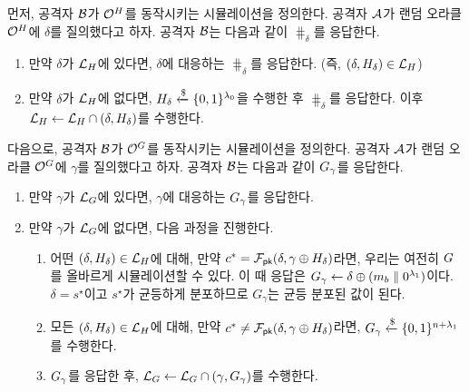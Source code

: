 \documentclass{article}
\theoremstyle{definition}
\newtheorem{memo}{메모}[section]
\begin{document}

먼저, 공격자 $\mathcal{B}$가 $\mathcal{O}^{H}$를 동작시키는 시뮬레이션을 정의한다. 공격자
$\mathcal{A}$가 랜덤 오라클 $\mathcal{O}^{H}$에 $\delta$를 질의했다고 하자. 공격자
$\mathcal{B}$는 다음과 같이 $\hash_{\delta}$를 응답한다.
\begin{enumerate}
	\item 만약 $\delta$가 $\mathcal{L}_{H}$에 있다면, $\delta$에 대응하는
	$\hash_\delta$를 응답한다. (즉, $(\delta, H_{\delta}) \in \mathcal{L}_{H}$)
	\item 만약 $\delta$가 $\mathcal{L}_{H}$에 없다면, $H_{\delta} \xleftarrow{\$}
	\{0 ,1\}^{\lambda_0}$을 수행한 후 $\hash_{\delta}$를 응답한다. 이후
	$\mathcal{L}_{H} \gets \mathcal{L}_{H} \cap (\delta, H_{\delta})$를
	수행한다.
\end{enumerate}

다음으로, 공격자 $\mathcal{B}$가 $\mathcal{O}^{G}$를 동작시키는 시뮬레이션을 정의한다.
공격자 $\mathcal{A}$가 랜덤 오라클 $\mathcal{O}^{G}$에 $\gamma$를 질의했다고 하자. 공격자
$\mathcal{B}$는 다음과 같이 $G_{\gamma}$를 응답한다.
\begin{enumerate}
	\item 만약 $\gamma$가 $\mathcal{L}_{G}$에 있다면, $\gamma$에 대응하는
	$G_{\gamma}$를 응답한다.
	\item 만약 $\gamma$가 $\mathcal{L}_{G}$에 없다면, 다음 과정을 진행한다.
	\begin{enumerate}
		\item 어떤 $(\delta, H_{\delta}) \in \mathcal{L}_{H}$에 대해, 만약
		$c^* = \mathcal{F}_{\textsf{pk}}(\delta, \gamma \oplus H_{\delta})$라면, 우리는 여전히
		$G$를 올바르게 시뮬레이션할 수 있다. 이 때 응답은 $G_{\gamma}
		\gets \delta \oplus (m_{b} \parallel 0^{\lambda_1})$이다. $\delta =
		s^\star$이고 $s^\star$가 균등하게 분포하므로 $G_\gamma$는 균등 분포된
		값이 된다. 
		\item 모든 $(\delta, H_{\delta}) \in \mathcal{L}_{H}$에 대해, 만약
		$c^* \neq \mathcal{F}_{\textsf{pk}}(\delta, \gamma \oplus H_{\delta})$라면,
		$G_{\gamma} \xleftarrow{\$} \{0 ,1\}^{n + \lambda_1}$를 수행한다.
		\item $G_{\gamma}$를 응답한 후, $\mathcal{L}_{G} \gets \mathcal{L}_{G}
		\cap (\gamma, G_{\gamma})$를 수행한다.
	\end{enumerate}
\end{enumerate}
\end{document}
